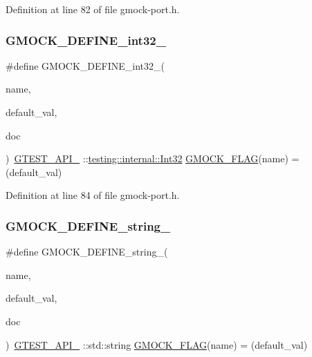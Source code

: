 Definition at line 82 of file gmock-\/port.\+h.

\mbox{\label{gmock-port_8h_a19d91081ff0aaab2f60ef1dc2d6e6b34}} 
\subsubsection{\texorpdfstring{G\+M\+O\+C\+K\+\_\+\+D\+E\+F\+I\+N\+E\+\_\+int32\+\_\+}{GMOCK\_DEFINE\_int32\_}}
{\footnotesize\ttfamily \#define G\+M\+O\+C\+K\+\_\+\+D\+E\+F\+I\+N\+E\+\_\+int32\+\_\+(\begin{DoxyParamCaption}\item[{}]{name,  }\item[{}]{default\+\_\+val,  }\item[{}]{doc }\end{DoxyParamCaption})~\hyperlink{gtest-port_8h_aa73be6f0ba4a7456180a94904ce17790}{G\+T\+E\+S\+T\+\_\+\+A\+P\+I\+\_\+} \+::\hyperlink{namespacetesting_1_1internal_a8ee38faaf875f133358abaf9bc056cec}{testing\+::internal\+::\+Int32} \hyperlink{gmock-port_8h_ad7119adfef06be5e7b1551633f5a1436}{G\+M\+O\+C\+K\+\_\+\+F\+L\+AG}(name) = (default\+\_\+val)}



Definition at line 84 of file gmock-\/port.\+h.

\mbox{\label{gmock-port_8h_ad6badbf90e5a813e2bd5668fc6b6a8f7}} 
\subsubsection{\texorpdfstring{G\+M\+O\+C\+K\+\_\+\+D\+E\+F\+I\+N\+E\+\_\+string\+\_\+}{GMOCK\_DEFINE\_string\_}}
{\footnotesize\ttfamily \#define G\+M\+O\+C\+K\+\_\+\+D\+E\+F\+I\+N\+E\+\_\+string\+\_\+(\begin{DoxyParamCaption}\item[{}]{name,  }\item[{}]{default\+\_\+val,  }\item[{}]{doc }\end{DoxyParamCaption})~\hyperlink{gtest-port_8h_aa73be6f0ba4a7456180a94904ce17790}{G\+T\+E\+S\+T\+\_\+\+A\+P\+I\+\_\+} \+::std\+::string \hyperlink{gmock-port_8h_ad7119adfef06be5e7b1551633f5a1436}{G\+M\+O\+C\+K\+\_\+\+F\+L\+AG}(name) = (default\+\_\+val)}



